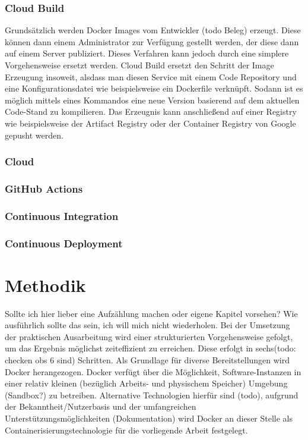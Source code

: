 \documentclass[pdftex,a4paper,abstracton,11pt,parskip=half,bibtotocnumbered]{scrartcl}
\begin{document}
		\subsubsection{Cloud Build}
 Grundsätzlich werden Docker Images vom Entwickler (todo Beleg) erzeugt. Diese können dann einem Administrator zur Verfügung gestellt werden, der diese dann auf einem Server publiziert. 
Dieses Verfahren kann jedoch durch eine simplere Vorgehensweise ersetzt werden. Cloud Build ersetzt den Schritt der Image Erzeugung insoweit, alsdass man diesen Service mit einem Code Repository und eine Konfigurationsdatei wie beispielsweise ein Dockerfile verknüpft.
Sodann ist es möglich mittels eines Kommandos eine neue Version basierend auf dem aktuellen Code-Stand zu kompilieren. Das Erzeugnis kann anschließend auf einer Registry wie beispielsweise der Artifact Registry oder der Container Registry von Google gepusht werden. 

\subsubsection{Cloud }
		\subsubsection{GitHub Actions}
		\subsubsection{Continuous Integration}
		\subsubsection{Continuous Deployment}

\section{Methodik}
	Sollte ich hier lieber eine Aufzählung machen oder eigene Kapitel vorsehen? Wie ausführlich sollte das sein, ich will mich nicht wiederholen. 
	Bei der Umsetzung der praktischen Ausarbeitung wird einer strukturierten Vorgehensweise gefolgt, um das Ergebnis möglichst zeiteffizient zu 
	erreichen. Diese erfolgt in sechs(todo: checken obs 6 sind) Schritten.
	Als Grundlage für diverse Bereitstellungen wird Docker herangezogen. Docker verfügt über die Möglichkeit, Software-Instanzen in einer relativ kleinen 
	(bezüglich Arbeits- und physischem Speicher) Umgebung (Sandbox?) zu betreiben. Alternative Technologien hierfür sind (todo), aufgrund der 
	Bekanntheit/Nutzerbasis und der	umfangreichen Unterstützungsmöglichkeiten (Dokumentation) wird Docker an dieser Stelle als Containerisierungstechnologie
	für die vorliegende Arbeit festgelegt.  
\end{document}
